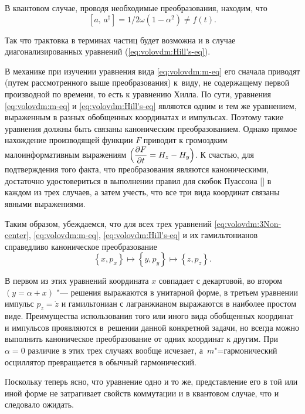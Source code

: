 В квантовом случае, проводя необходимые преобразования, находим, что
\[
\left[a,\, a^{\dagger}\right]=1/2\omega\left(1-\alpha^{2}\right)\neq f(t).
\]


Так что трактовка в терминах частиц будет возможна и в случае диагонализированных
уравнений (\ref{eq:volovdm:Hill's-eq}).


\smallskip

В механике при изучении уравнения вида \eqref{eq:volovdm:m-eq} его сначала
приводят (путем рассмотренного выше преобразования) к~виду, не содержащему
первой производной по времени, то есть к уравнению Хилла. 
По сути, уравнения \eqref{eq:volovdm:m-eq} и \eqref{eq:volovdm:Hill's-eq} являются одним и тем
же уравнением, выраженным в разных обобщенных координатах и импульсах.
Поэтому такие уравнения должны быть связаны каноническим преобразованием.
Однако прямое нахождение производящей функции $F$ приводит к громоздким
малоинформативным выражениям $\Bigl(\dfrac{\partial F}{\partial t}=H_{z}-H_{y}\Bigr)$.
К счастью, для подтверждения того факта, что преобразования являются
каноническими, достаточно удостовериться в выполнении правил для скобок
Пуассона {[]} в каждом из трех случаев, а затем учесть,
что все три вида координат связаны явными выражениями.


Таким образом, убеждаемся, что для всех трех уравнений \eqref{eq:volovdm:3Non-center},
\eqref{eq:volovdm:m-eq}, \eqref{eq:volovdm:Hill's-eq} и их гамильтонианов справедливо
каноническое преобразование 
\[
\left\{ x,  p_{x}\right\} \mapsto\left\{ y,  p_{y}\right\} \mapsto\left\{ z,  p_{z}\right\} .
\]


В первом из этих уравнений координата $x$ совпадает с декартовой,
во втором $(y=\alpha+x)$ "--- решения выражаются в унитарной
форме, в третьем уравнении импульс $p_{z}=\dot{z}$ и гамильтониан
с лагранжианом выражаются в наиболее простом виде. 
Преимущества использования того или иного вида обобщенных координат и импульсов проявляются в~решении данной конкретной задачи, но всегда можно выполнить каноническое
преобразование от одних координат к другим. При $\alpha=0$ различие в этих трех случаях вообще исчезает, а~$m$"=гармонический осциллятор превращается в обычный гармонический.

Поскольку теперь ясно, что уравнение одно и то же, представление его
в той или иной форме не затрагивает свойств коммутации и в квантовом
случае, что и следовало ожидать.


\smallskip

